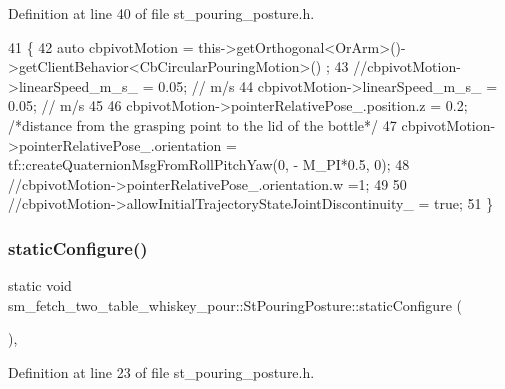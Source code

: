 Definition at line 40 of file st\+\_\+pouring\+\_\+posture.\+h.


\begin{DoxyCode}
41         \{
42             \textcolor{keyword}{auto} cbpivotMotion = this->getOrthogonal<OrArm>()->getClientBehavior<CbCircularPouringMotion>()
      ;
43             \textcolor{comment}{//cbpivotMotion->linearSpeed\_m\_s\_ = 0.05; // m/s}
44             cbpivotMotion->linearSpeed\_m\_s\_ = 0.05; \textcolor{comment}{// m/s}
45 
46             cbpivotMotion->pointerRelativePose\_.position.z = 0.2; \textcolor{comment}{/*distance from the grasping point to the
       lid of the bottle*/}
47             cbpivotMotion->pointerRelativePose\_.orientation = tf::createQuaternionMsgFromRollPitchYaw(0, -
      M\_PI*0.5, 0);
48             \textcolor{comment}{//cbpivotMotion->pointerRelativePose\_.orientation.w =1;}
49 
50             \textcolor{comment}{//cbpivotMotion->allowInitialTrajectoryStateJointDiscontinuity\_ = true;}
51         \}
\end{DoxyCode}
\mbox{\label{structsm__fetch__two__table__whiskey__pour_1_1StPouringPosture_a1cc6115b2faeb234e5c13a47ee5f577e}} 
\subsubsection{\texorpdfstring{static\+Configure()}{staticConfigure()}}
{\footnotesize\ttfamily static void sm\+\_\+fetch\+\_\+two\+\_\+table\+\_\+whiskey\+\_\+pour\+::\+St\+Pouring\+Posture\+::static\+Configure (\begin{DoxyParamCaption}{ }\end{DoxyParamCaption})\hspace{0.3cm}{\ttfamily [inline]}, {\ttfamily [static]}}



Definition at line 23 of file st\+\_\+pouring\+\_\+posture.\+h.


